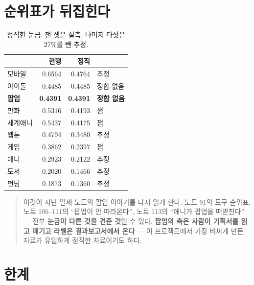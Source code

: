 \documentclass[10pt]{article}
\begin{document}
\section{순위표가 뒤집힌다}

\begin{table}[t]
\centering\tsize
\caption{정직한 눈금. 잰 셋은 실측, 나머지 다섯은 27\%를 뺀 추정.}
\begin{tabular}{lrrl}
\toprule
& 현행 & 정직 & \\
\midrule
모바일 & 0.6564 & 0.4764 & 추정 \\
아이돌 & 0.4485 & 0.4485 & 정합 없음 \\
\textbf{팝업} & \textbf{0.4391} & \textbf{0.4391} & \textbf{정합 없음} \\
만화 & 0.5316 & 0.4193 & 잼 \\
세계애니 & 0.5437 & 0.4175 & 잼 \\
웹툰 & 0.4794 & 0.3480 & 추정 \\
게임 & 0.3862 & 0.2397 & 잼 \\
애니 & 0.2923 & 0.2122 & 추정 \\
도서 & 0.2020 & 0.1466 & 추정 \\
펀딩 & 0.1873 & 0.1360 & 추정 \\
\bottomrule
\end{tabular}
\end{table}


\begin{quote}\fontsize{9.5}{11.5}\selectfont
이것이 지난 열세 노트의 팝업 이야기를 다시 읽게 한다. 노트 91의 도구 순위표,
노트 106--111의 ``팝업이 안 따라온다'', 노트 113의 ``애니가 팝업을 떠받친다''
--- 전부 \textbf{눈금이 다른 것을 견준 것}일 수 있다. \textbf{팝업의 축은
사람이 기획서를 읽고 매기고 라벨은 결과보고서에서 온다} --- 이 프로젝트에서
가장 비싸게 만든 자료가 유일하게 정직한 자료이기도 하다.
\end{quote}

\section{한계}
\end{document}
